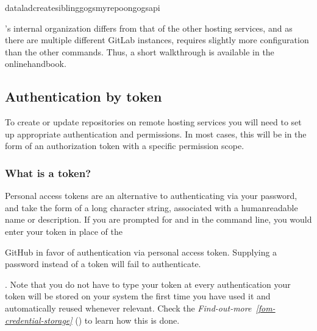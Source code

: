 \begin{sphinxVerbatim}[commandchars=\\\{\}]
dataladcreate\PYGZhy{}sibling\PYGZhy{}gogsmy\PYGZus{}repo\PYGZus{}on\PYGZus{}gogs\PYGZhy{}\PYGZhy{}api
\end{sphinxVerbatim}

\sphinxAtStartPar
{\hyperref[\detokenize{glossary:term-GitLab}]{}}’s internal organization differs from that of the other hosting services, and as there are multiple different GitLab instances,  requires slightly more configuration than the other commands.
Thus, a short walk\sphinxhyphen{}through is available in the online\sphinxhyphen{}handbook.


\subsection{Authentication by token}
\label{\detokenize{basics/101-139-hostingservices:authentication-by-token}}\label{\detokenize{basics/101-139-hostingservices:token}}
\sphinxAtStartPar
To create or update repositories on remote hosting services you will need to set up appropriate authentication and permissions.
In most cases, this will be in the form of an authorization token with a specific permission scope.


\subsubsection{What is a token?}
\label{\detokenize{basics/101-139-hostingservices:what-is-a-token}}
\sphinxAtStartPar
Personal access tokens are an alternative to authenticating via your password, and take the form of a long character string, associated with a human\sphinxhyphen{}readable name or description.
If you are prompted for  and  in the command line, you would enter your token in place of the %
\begin{footnote}\sphinxAtStartFootnote
GitHub  in favor of authentication via personal access token. Supplying a password instead of a token will fail to authenticate.
%
\end{footnote}.
Note that you do not have to type your token at every authentication \textendash{} your token will be stored on your system the first time you have used it and automatically reused whenever relevant. Check the \textit{Find-out-more}~{\findoutmoreiconinline}\textit{\ref{fom-credential-storage}} {\hyperref[\detokenize{basics/101-139-hostingservices:fom-credential-storage}]{}} () to learn how this is done.

